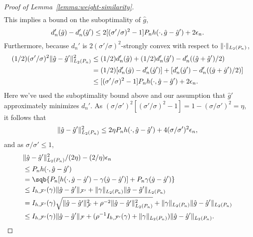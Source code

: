 \begin{proof}[Proof of Lemma~\ref{lemma:weight-similarity}]
\begin{align*}
\end{align*}
This implies a bound on the suboptimality of $\hat g$,
\[ d_n'(\hat g) - d_n'(\hat g') \le 2[(\sigma'/\sigma)^2 - 1]\Pn h(\cdot, \hat g - \hat g') + 2\epsilon_n. \]
Furthermore, because $d_n'$ is $2(\sigma'/\sigma)^2$-strongly convex with respect to $\norm{\cdot}_{L_2(\Pn)}$,
\begin{align*}
(1/2)(\sigma'/\sigma)^2 \norm{\hat g - \hat g'}_{L_2(\Pn)}^2 
&\le (1/2)d_n'(\hat g) + (1/2)d_n'(\hat g') - d_n'((\hat g + \hat g')/2) \\
&= (1/2)[d_n'(\hat g) - d_n'(\hat g')] + [d_n'(\hat g') - d_n'((\hat g + \hat g')/2)] \\
&\le [(\sigma'/\sigma)^2 - 1]\Pn h(\cdot, \hat g - \hat g') + 2\epsilon_n. 
\end{align*}
Here we've used the suboptimality bound above and our assumption that $\hat g'$ approximately
minimizes $d_n'$. As $(\sigma/\sigma')^{2}[(\sigma'/\sigma)^2 - 1] = 1- (\sigma/\sigma')^2 = \eta$,
it follows that
\[ \norm{\hat g - \hat g'}_{L_2(\Pn)}^2 \le 2\eta  \Pn h(\cdot, \hat g - \hat g') + 4 (\sigma/\sigma')^2\epsilon_n, \]
and as $\sigma/\sigma' \le 1$,
\begin{equation}
\label{eq:two-gs-l2-bound}
\begin{aligned}
&\norm{\hat g - \hat g'}_{L_2(\Pn)}^2/(2\eta) - (2/\eta)\epsilon_n\\ 
&\le \Pn h(\cdot, \hat g - \hat g')  \\
&=   \sqb{ \Pn[ h(\cdot, \hat g - \hat g') - \gamma (\hat g - \hat g')] 
		   			         	+ \Pn \gamma (\hat g - \hat g') }  \\
&\le I_{h,\F'}(\gamma)\norm{\hat g - \hat g'}_{\F'} + \norm{\gamma}_{L_2(\Pn)} \norm{\hat g - \hat g'}_{L_2(\Pn)} \\ 
&= I_{h,\F'}(\gamma)\sqrt{\norm{\hat g - \hat g'}_{\F}^2 + \rho^{-2}\norm{\hat g - \hat g'}_{L_2(\Pn)}^2} + \norm{\gamma}_{L_2(\Pn)} \norm{\hat g - \hat g'}_{L_2(\Pn)} \\
&\le I_{h,\F'}(\gamma)\norm{\hat g - \hat g'}_{\F} + ( \rho^{-1} I_{h,\F'}(\gamma) + \norm{\gamma}_{L_2(\Pn)}) \norm{\hat g - \hat g'}_{L_2(\Pn)}.
\end{aligned}
\end{equation}


\end{proof}
